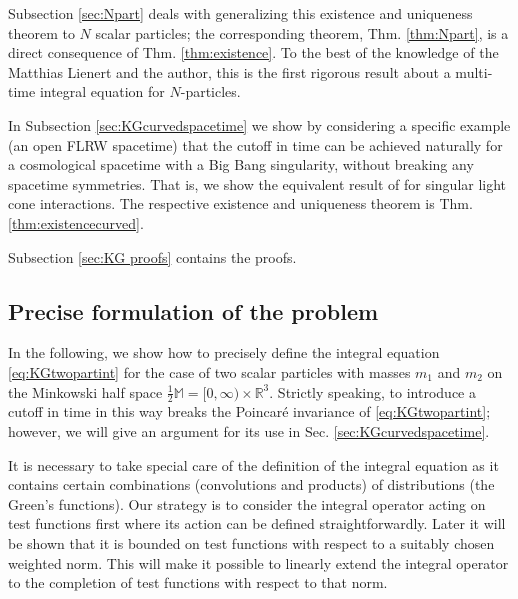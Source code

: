 \documentclass[b5paper,draft,openbib,12pt]{memoir}
\newcommand{\R}{\mathbb{R}}
\newcommand{\M}{\mathbb{M}}
\begin{document}
Subsection \ref{sec:Npart} deals with generalizing this existence and 
uniqueness theorem to $N$ scalar particles; the corresponding 
theorem, Thm. \ref{thm:Npart}, is a direct consequence of Thm.
\ref{thm:existence}. To the best of the knowledge of 
the Matthias Lienert and the author, this is the 
first rigorous result about a multi-time integral equation for 
$N$-particles. 

In Subsection \ref{sec:KGcurvedspacetime} we show by considering a 
specific example (an open FLRW spacetime) that the cutoff in time 
can be achieved naturally for a cosmological spacetime with a Big 
Bang singularity, without breaking any spacetime symmetries. That 
is, we show the equivalent result of \cite{lienertcurved} for 
singular light cone interactions. The respective existence and 
uniqueness theorem is Thm. \ref{thm:existencecurved}.

Subsection \ref{sec:KG proofs} contains the proofs.



\subsection{Precise formulation of the problem}
\label{sec:formulation}

In the following, we show how to precisely define the integral 
equation \eqref{eq:KGtwopartint} for the case of two scalar particles with 
masses $m_1$ and $m_2$ on the Minkowski half space $\frac{1}{2}\M = 
[0,\infty) \times \R^3$. Strictly speaking, to introduce a cutoff 
in time in this way breaks the Poincar\'e invariance of 
\eqref{eq:KGtwopartint}; however, we will give an argument for its use 
in Sec. \ref{sec:KGcurvedspacetime}.

It is necessary to take special care of the definition of the 
integral equation as it contains certain combinations (convolutions 
and products) of distributions (the Green's functions). Our strategy 
is to consider the integral operator acting on test functions first 
where its action can be defined straightforwardly. Later it will be 
shown that it is bounded on test functions with respect to a suitably 
chosen weighted norm. This will make it possible to linearly extend 
the integral operator to the completion of test functions with 
respect to that norm.
\end{document}
